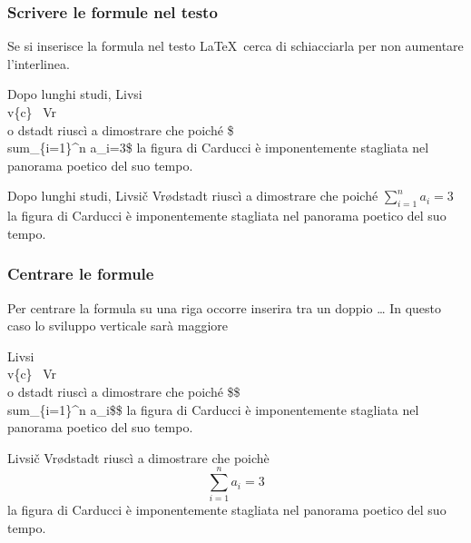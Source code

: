 \documentclass[svgnames,%
	ucs,%
	pdftex]{guitbeamer}
\begin{document}
\begin{frame}
  \frametitle{Scrivere le formule nel testo}
	Se si inserisce la formula nel testo \LaTeX\ cerca di schiacciarla per non aumentare l'interlinea.
	\begin{LaTeXcode}
		Dopo lunghi studi, Livsi\\v\{c\} \ Vr\\o dstadt riusc\`i a dimostrare che poich\'e \alert{\$\\sum\_\{i=1\}\textasciicircum n a\_i=3\$} la figura di Carducci \`e imponentemente stagliata nel panorama poetico del suo tempo.
	\end{LaTeXcode}
	\begin{LaTeXoutput}
		Dopo lunghi studi, Livsi\v{c} Vr\o dstadt riusc\`i a dimostrare che poich\'e $\sum_{i=1}^n a_i=3$ la figura di Carducci \`e imponentemente stagliata nel panorama poetico del suo tempo.
	\end{LaTeXoutput}
\end{frame}
\begin{frame}
  \frametitle{Centrare le formule}
	Per centrare la formula su una riga occorre inserira tra un doppio \LCmd[]{\textdollar}\LCmd[]{\textdollar}\dots\LCmd[]{\textdollar}\LCmd[]{\textdollar} In questo caso lo sviluppo verticale sar\`a maggiore
	\begin{LaTeXcode}
		Livsi\\v\{c\} \ Vr\\o dstadt riusc\`i a dimostrare che poich\'e
		\alert{\$\$\\sum\_\{i=1\}\textasciicircum n a\_i\$\$} la figura di Carducci \`e imponentemente stagliata nel panorama poetico del suo tempo. 
	\end{LaTeXcode}
	\begin{LaTeXoutput}
		Livsi\v{c} Vr\o dstadt riusc\`i a dimostrare che poich\`e
			$$\sum_{i=1}^n a_i=3$$
		la figura di Carducci \`e imponentemente stagliata nel panorama poetico del suo tempo. 
	\end{LaTeXoutput}
\end{frame}
\end{document}
